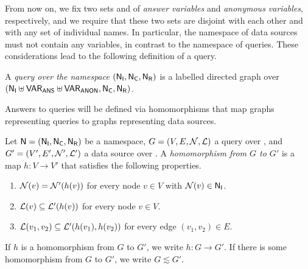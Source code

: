From now on, we fix two sets \VARANS and \VARANON
of \emph{answer variables} and \emph{anonymous variables}, respectively,
and we require that these two sets are disjoint with each other
and with any set \NI of individual names.
In particular, the namespace of data sources must not contain any variables,
in contrast to the namespace of queries.
These considerations lead to the following definition of a query.

\begin{definition}
  A \emph{query over the namespace $(\mathsf{N}_\mathsf{I},\mathsf{N}_\mathsf{C},\mathsf{N}_\mathsf{R})$} is a labelled directed graph
  over $(\mathsf{N}_\mathsf{I} \uplus \mathsf{VAR}_\mathsf{ANS} \uplus \mathsf{VAR}_\mathsf{ANON}, \mathsf{N}_\mathsf{C}, \mathsf{N}_\mathsf{R})$.
\end{definition}
%
%
Answers to queries will be defined via homomorphisms that map graphs representing queries
to graphs representing data sources.
%
\begin{definition}
  Let $\textup{\textsf{N}}=(\mathsf{N}_\mathsf{I},\mathsf{N}_\mathsf{C},\mathsf{N}_\mathsf{R})$ be a namespace, $G = (V,E,\mathcal{N},\mathcal{L})$ a query over \namespace,
  and $G' = (V',E',\mathcal{N}',\mathcal{L}')$ a data source over \namespace.
  A \emph{homomorphism from $G$ to $G'$} is a map $h : V \to V'$ that satisfies the following properties.
  \begin{enumerate}
    \item[\hmph{1}]
      $\mathcal{N}(v) = \mathcal{N}'(h(v))$ for every node $v \in V$ with $\mathcal{N}(v) \in \mathsf{N}_\mathsf{I}$.
    \item[\hmph{2}]
      $\mathcal{L}(v) \subseteq \mathcal{L}'(h(v))$ for every node $v \in V$.
    \item[\hmph{3}]
      $\mathcal{L}(v_1, v_2) \subseteq \mathcal{L}'(h(v_1), h(v_2))$
      for every edge $(v_1,v_2) \in E$.
  \end{enumerate}
  If $h$ is a homomorphism from $G$ to $G'$, we write $h : G \to G'$.
  If there is some homomorphism from $G$ to $G'$, we write $G \lesssim G'$.
\end{definition}
